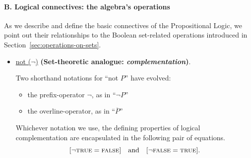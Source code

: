 \paragraph{B. Logical connectives: the algebra's operations}

\noindent
As we describe and define the basic connectives of the Propositional
Logic, we point out their relationships to the Boolean set-related
operations introduced in Section~\ref{sec:operations-on-sets}.

\medskip

\begin{itemize}
\item
\underline{{\sc not} ($\neg$)}
{\bf (Set-theoretic analogue: {\em complementation})}.


Two shorthand notations for ``{\sc not} $P$'' have evolved:
  \begin{itemize}
  \item
the prefix-operator $\neg$, as in ``$\neg P$''
  \item
the overline-operator, as in ``$\overline{P}$''
  \end{itemize}
Whichever notation we use, the defining properties of logical
complementation are encapsulated in the following pair of equations.
\[
[\neg \mbox{\sc true} = \mbox{\sc false}] \ \ \mbox{ and } \ \ [\neg
  \mbox{\sc false} = \mbox{\sc true}].
\]
\end{itemize}

\medskip


